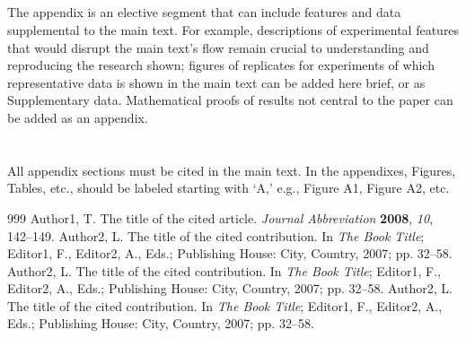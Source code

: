 \documentclass[SCMIJ,viewpoint ,submit,moreauthors,pdftex]{Files/scmij}
\begin{document}
\subsection{}
The appendix is an elective segment that can include features and data supplemental to the main text. For example, descriptions of experimental features that would disrupt the main text's flow remain crucial to understanding and reproducing the research shown; figures of replicates for experiments of which representative data is shown in the main text can be added here brief, or as Supplementary data. Mathematical proofs of results not central to the paper can be added as an appendix.

\section{}
All appendix sections must be cited in the main text. In the appendixes, Figures, Tables, etc., should be labeled starting with `A,' e.g., Figure A1, Figure A2, etc. 





%

\begin{thebibliography}{999}
Author1, T. The title of the cited article. {\em Journal Abbreviation} {\bf 2008}, {\em 10}, 142--149.
Author2, L. The title of the cited contribution. In {\em The Book Title}; Editor1, F., Editor2, A., Eds.; Publishing House: City, Country, 2007; pp. 32--58.
Author2, L. The title of the cited contribution. In {\em The Book Title}; Editor1, F., Editor2, A., Eds.; Publishing House: City, Country, 2007; pp. 32--58.
Author2, L. The title of the cited contribution. In {\em The Book Title}; Editor1, F., Editor2, A., Eds.; Publishing House: City, Country, 2007; pp. 32--58.
\end{thebibliography}


\end{document}
